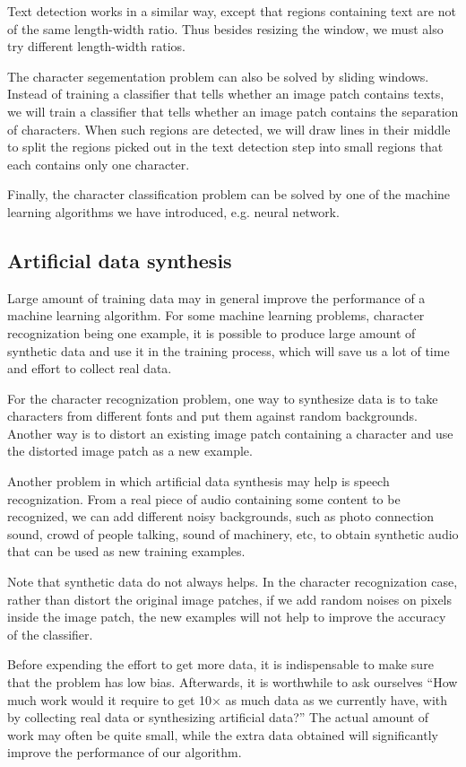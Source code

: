 Text detection works in a similar way, except that regions containing text are not of the same length-width ratio. Thus besides resizing the window, we must also try different length-width ratios.

The character segementation problem can also be solved by sliding windows. Instead of training a classifier that tells whether an image patch contains texts, we will train a classifier that tells whether an image patch contains the separation of characters. When such regions are detected, we will draw lines in their middle to split the regions picked out in the text detection step into small regions that each contains only one character.

Finally, the character classification problem can be solved by one of the machine learning algorithms we have introduced, e.g. neural network.
\subsection{Artificial data synthesis}
Large amount of training data may in general improve the performance of a machine learning algorithm. For some machine learning problems, character recognization being one example, it is possible to produce large amount of synthetic data and use it in the training process, which will save us a lot of time and effort to collect real data.

For the character recognization problem, one way to synthesize data is to take characters from different fonts and put them against random backgrounds. Another way is to distort an existing image patch containing a character and use the distorted image patch as a new example.

Another problem in which artificial data synthesis may help is speech recognization. From a real piece of audio containing some content to be recognized, we can add different noisy backgrounds, such as photo connection sound, crowd of people talking, sound of machinery, etc, to obtain synthetic audio that can be used as new training examples.

Note that synthetic data do not always helps. In the character recognization case, rather than distort the original image patches, if we add random noises on pixels inside the image patch, the new examples will not help to improve the accuracy of the classifier. 

Before expending the effort to get more data, it is indispensable to make sure that the problem has low bias. Afterwards, it is worthwhile to ask ourselves ``How much work would it require to get 10$\times$ as much data as we currently have, with by collecting real data or synthesizing artificial data?'' The actual amount of work may often be quite small, while the extra data obtained will significantly improve the performance of our algorithm.
